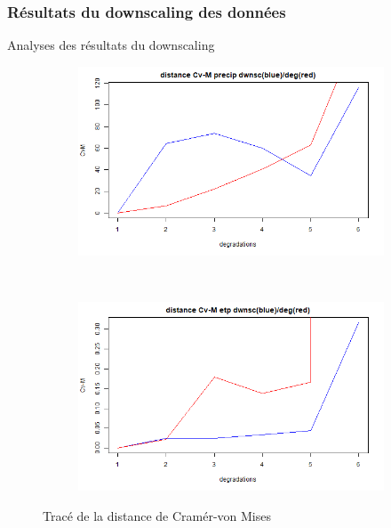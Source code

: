 \documentclass{beamer}
\numberwithin{equation}{section}
\begin{document}
	\subsubsection{Résultats du downscaling des données}

	\begin{frame}{Analyses des résultats du downscaling}
		\begin{minipage}[b]{0.5\linewidth}
			\begin{figure}
				\label{fig-res_CVM_CDFt}
				\centering
				\begin{subfigure}[b]{0.5\textwidth}
					\includegraphics[scale=0.2]{images/Dist_CVM_precip_CDFt.png}
				\end{subfigure}\\
				\begin{subfigure}[b]{0.5\textwidth}
					\includegraphics[scale=0.2]{images/Dist_CVM_evap_CDFt.png}
				\end{subfigure}
				\caption{Tracé de la distance de Cramér-von Mises}
			\end{figure}

\end{minipage}
\end{frame}
\end{document}
